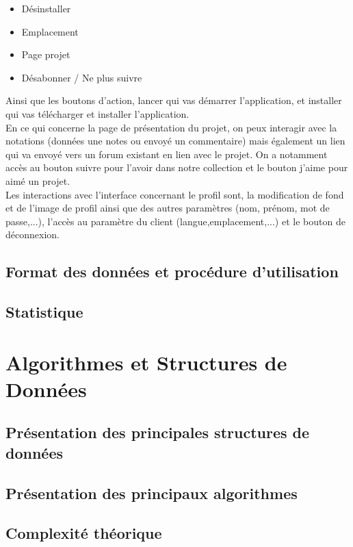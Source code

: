 \documentclass{report}
\begin{document}
\begin{itemize}
    \item Désinstaller
    \item Emplacement
    \item Page projet
    \item Désabonner / Ne plus suivre
\end{itemize}
Ainsi que les boutons d'action, lancer qui vas démarrer l'application, et installer qui vas télécharger et installer l'application.\\
En ce qui concerne la page de présentation du projet, on peux interagir avec la notations (données une notes ou envoyé un commentaire) mais également un lien qui va envoyé vers un forum existant en lien avec le projet. On a notamment accès au bouton suivre pour l'avoir dans notre collection et le bouton j'aime pour aimé un projet.\\
Les interactions avec l'interface concernant le profil sont, la modification de fond et de l'image de profil ainsi que des autres paramètres (nom, prénom, mot de passe,...), l'accès au paramètre du client (langue,emplacement,...) et le bouton de déconnexion.

\section{Format des données et procédure d'utilisation} %
\section{Statistique} %

\chapter{Algorithmes et Structures de Données}
\section{Présentation des principales structures de données}
\section{Présentation des principaux algorithmes}%
\section{Complexité théorique}
\end{document}
